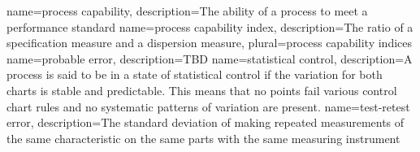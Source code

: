{
    name={process capability},
    description={The ability of a process to meet a performance standard}
}
{
    name={process capability index},
    description={The ratio of a specification measure and a dispersion measure},
    plural={process capability indices}
}
{
    name={probable error},
    description={TBD}
}
{
    name={statistical control},
    description={A process is said to be in a state of statistical control if the variation for both charts is stable and predictable. This means that no points fail various control chart rules and no systematic patterns of variation are present.}
}
{
    name={test-retest error},
    description={The standard deviation of making repeated measurements of the same characteristic on the same parts with the same measuring instrument}
}
